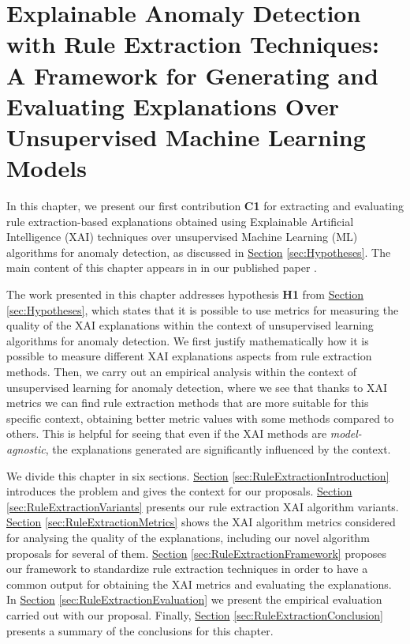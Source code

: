 \chapter{Explainable Anomaly Detection with Rule Extraction Techniques: A Framework for Generating and Evaluating Explanations Over Unsupervised Machine Learning Models}\label{chap:4-rule-extraction}

In this chapter, we present our first contribution \textbf{C1} for extracting and evaluating rule extraction-based explanations obtained using Explainable Artificial Intelligence (XAI) techniques over unsupervised Machine Learning (ML) algorithms for anomaly detection, as discussed in \hyperref[sec:Hypotheses]{Section} \ref{sec:Hypotheses}. The main content of this chapter appears in in our published paper \parencite{barbado2022rule}.

The work presented in this chapter addresses hypothesis \textbf{H1} from \hyperref[sec:Hypotheses]{Section} \ref{sec:Hypotheses}, which states that it is possible to use metrics for measuring the quality of the XAI explanations within the context of unsupervised learning algorithms for anomaly detection. We first justify mathematically how it is possible to measure different XAI explanations aspects from rule extraction methods. Then, we carry out an empirical analysis within the context of unsupervised learning for anomaly detection, where we see that thanks to XAI metrics we can find rule extraction methods that are more suitable for this specific context, obtaining better metric values with some methods compared to others. This is helpful for seeing that even if the XAI methods are \textit{model-agnostic}, the explanations generated are significantly influenced by the context.

We divide this chapter in six sections. \hyperref[sec:RuleExtractionIntroduction]{Section} \ref{sec:RuleExtractionIntroduction} introduces the problem and gives the context for our proposals. \hyperref[sec:RuleExtractionVariants]{Section} \ref{sec:RuleExtractionVariants} presents our rule extraction XAI algorithm variants. \hyperref[sec:RuleExtractionMetrics]{Section} \ref{sec:RuleExtractionMetrics} shows the XAI algorithm metrics considered for analysing the quality of the explanations, including our novel algorithm proposals for several of them. \hyperref[sec:RuleExtractionFramework]{Section} \ref{sec:RuleExtractionFramework} proposes our framework to standardize rule extraction techniques in order to have a common output for obtaining the XAI metrics and evaluating the explanations. In \hyperref[sec:RuleExtractionEvaluation]{Section} \ref{sec:RuleExtractionEvaluation} we present the empirical evaluation carried out with our proposal. Finally, \hyperref[sec:RuleExtractionConclusion]{Section} \ref{sec:RuleExtractionConclusion} presents a summary of the conclusions for this chapter.

